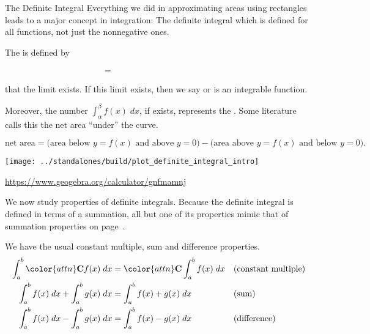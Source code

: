 \documentclass[../main.tex]{subfiles}
\begin{document}
\begin{lesson}{The Definite Integral}
  Everything we did in approximating areas using rectangles leads to a major concept in integration: The definite integral which is defined for all functions, not just the nonnegative ones.
  \begin{mdframed}[style=withref-compact]
    The  is defined by 
    \begin{equation} \label{eq:definite-integral} 
      \phantom{\int_{\alpha}^{\beta} f(x) \;dx} = \hspace{3in}
    \end{equation}
     that the limit exists. If this limit exists, then we say  or is an integrable function. 

    Moreover, the number \(\int_{\alpha}^{\beta} f(x) \;dx\), if exists, represents the  . Some literature calls this the net area ``under'' the curve.
  \end{mdframed}
  \[
    \text{net area} = \bigg(\text{area below \(y = f(x)\) and above \(y = 0\)}\bigg) - \bigg(\text{area above \(y = f(x)\) and below \(y = 0\)}\bigg).
  \]
  
  \texttt{[image: ../standalones/build/plot\_definite\_integral\_intro]}

  \url{https://www.geogebra.org/calculator/gnfmamnj}
  

  \bigskip
  We now study properties of definite integrals. Because the definite integral is defined in terms of a summation, all but one of its properties mimic that of summation properties on page~\pageref{page:summation-properties}.

  We have the usual constant multiple, sum and difference properties.
  \begin{align*}
    \int_{a}^{b} {\color{attn} \mathbf{C}} f(x) \;dx &= {\color{attn} \mathbf{C}} \int_{a}^{b} f(x) \;dx && \text{(constant multiple)}\\
    \int_{a}^{b} f(x) \;dx + \int_{a}^{b} g(x) \;dx &= \int_{a}^{b} f(x) + g(x) \;dx && \text{(sum)} \\
    \int_{a}^{b} f(x) \;dx - \int_{a}^{b} g(x) \;dx &= \int_{a}^{b} f(x) - g(x) \;dx && \text{(difference)}
  \end{align*}
  \clearpage
    

\end{lesson}
\end{document}
